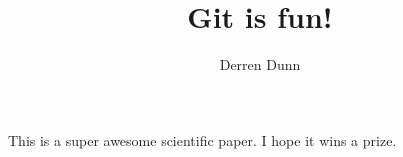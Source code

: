 \documentclass[10pt]{article}
\author{Derren Dunn}
\title{Git is fun!}
\begin{document}
  \maketitle
   This is a super awesome scientific paper. I hope it wins a prize.
\end{document}
